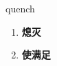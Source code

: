 
\begin{frame}
{\huge quench}
\begin{center}
\begin{enumerate}\Large
  \item \textbf{熄灭}
  \item \textbf{使满足}
\end{enumerate}
\end{center}
\end{frame}
